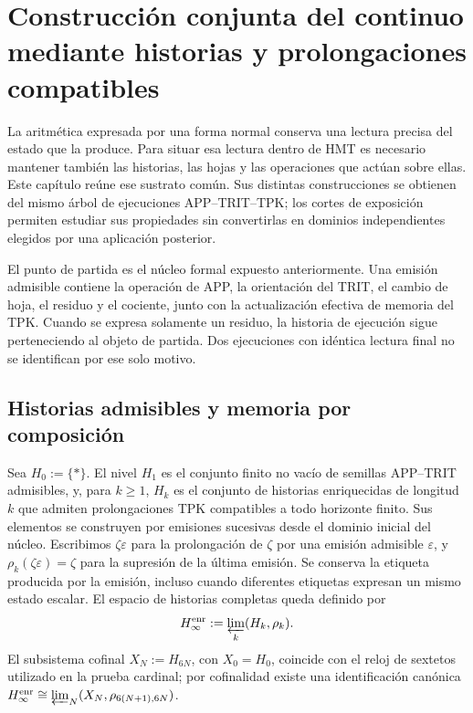 \section{Construcción conjunta del continuo mediante historias y prolongaciones compatibles}
\label{hmtfg:base:iv:continuo-conjunto}
La aritmética expresada por una forma normal conserva una lectura precisa del estado que la produce. Para situar esa lectura dentro de HMT es necesario mantener también las historias, las hojas y las operaciones que actúan sobre ellas. Este capítulo reúne ese sustrato común. Sus distintas construcciones se obtienen del mismo árbol de ejecuciones APP–TRIT–TPK; los cortes de exposición permiten estudiar sus propiedades sin convertirlas en dominios independientes elegidos por una aplicación posterior.

El punto de partida es el núcleo formal expuesto anteriormente. Una emisión admisible contiene la operación de APP, la orientación del TRIT, el cambio de hoja, el residuo y el cociente, junto con la actualización efectiva de memoria del TPK. Cuando se expresa solamente un residuo, la historia de ejecución sigue perteneciendo al objeto de partida. Dos ejecuciones con idéntica lectura final no se identifican por ese solo motivo.



\subsection{Historias admisibles y memoria por composición}
Sea \(H_0:=\{\ast\}\). El nivel \(H_1\) es el conjunto finito no vacío de
semillas APP--TRIT admisibles, y, para \(k\geq1\), \(H_k\) es el conjunto de
historias enriquecidas de longitud \(k\) que admiten prolongaciones TPK
compatibles a todo horizonte finito. Sus elementos se construyen por emisiones
sucesivas desde el dominio inicial del núcleo. Escribimos \(\zeta\varepsilon\)
para la prolongación de \(\zeta\) por una emisión admisible \(\varepsilon\), y
\(\rho_k(\zeta\varepsilon)=\zeta\) para la supresión de la última emisión. Se
conserva la etiqueta producida por la emisión, incluso cuando diferentes
etiquetas expresan un mismo estado escalar. El espacio de historias completas
queda definido por
\[
 H_\infty^{\rm enr}:=\varprojlim_k(H_k,\rho_k).
\]
El subsistema cofinal \(X_N:=H_{6N}\), con \(X_0=H_0\), coincide con el reloj
de sextetos utilizado en la prueba cardinal; por cofinalidad existe una
identificación canónica
\(H_\infty^{\rm enr}\cong\varprojlim_N(X_N,\rho_{6(N+1),6N})\).

